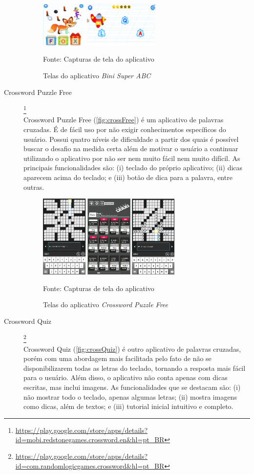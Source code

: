 \begin{description}
\begin{figure}[H]
\centering
    \caption{Telas do aplicativo \textit{Bini Super ABC}}
    \label{fig:biniABC}
    \includegraphics[width=0.6\textwidth]{Figuras/biniabc.png}
    
    Fonte: Capturas de tela do aplicativo
\end{figure}

\item[Crossword Puzzle Free]\footnote{\url{https://play.google.com/store/apps/details?id=mobi.redstonegames.crossword.en&hl=pt_BR}} \hfill \\
Crossword Puzzle Free (\autoref{fig:crossFree}) é um aplicativo de palavras cruzadas. É de fácil  uso por não exigir conhecimentos específicos do usuário. Possui quatro níveis de dificuldade a partir dos quais é possível buscar o desafio na medida certa além de motivar o usuário a continuar utilizando o aplicativo por não ser nem muito fácil nem muito difícil. As principais funcionalidades são: (i) teclado do próprio aplicativo; (ii) dicas aparecem acima do teclado; e (iii) botão de dica para a palavra, entre outras.


\begin{figure}[H]
\centering
    \caption{Telas do aplicativo \textit{Crossword Puzzle Free}}
    \label{fig:crossFree}
    \includegraphics[width=0.7\textwidth]{Figuras/crosswordPuzzleFree.jpg}
    
    Fonte: Capturas de tela do aplicativo
\end{figure}

\item[Crossword Quiz]\footnote{\url{https://play.google.com/store/apps/details?id=com.randomlogicgames.crossword&hl=pt_BR}} \hfill \\
Crossword Quiz (\autoref{fig:crossQuiz}) é outro aplicativo de palavras cruzadas, porém com uma abordagem mais facilitada pelo fato de não se disponibilizarem todas as letras do teclado, tornando a resposta mais fácil para o usuário. Além disso, o aplicativo não conta apenas com dicas escritas, mas inclui imagens. As funcionalidades que se destacam são: (i) não mostrar todo o teclado, apenas algumas letras; (ii) mostra imagens como dicas, além de textos; e (iii) tutorial inicial intuitivo e completo.


\end{description}
